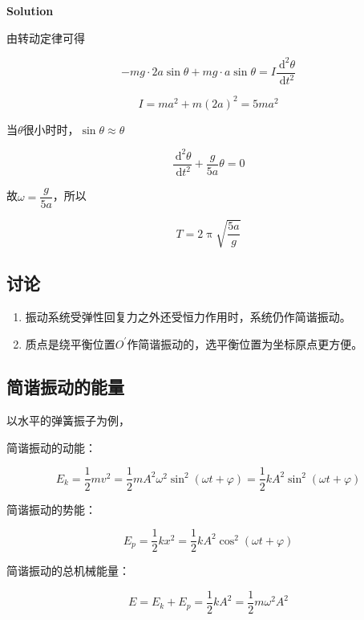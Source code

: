 \documentclass[12pt, a4paper]{article}
\numberwithin{equation}{section}
\newcommand{\rmd}{\mathrm{~d}}
\begin{document}
    \vspace{1em}

    \textbf{Solution}
    \vspace{1em}

    由转动定律可得

    \[
        -mg \cdot 2a \sin \theta + mg \cdot a \sin \theta = I \frac{\rmd^2 \theta}{\rmd t^2}
    \]

    \[
        I = ma^2 + m\left(2a\right)^2 = 5 ma^2
    \]

    当\(\theta\)很小时时，\(\sin \theta \approx \theta\)

    \[
        \frac{\rmd^2 \theta}{\rmd t^2} + \frac{g}{5a}\theta =0
    \]

    故\(\omega = \dfrac{g}{5a}\)，所以

    \[
        T = 2\uppi \sqrt{\frac{5a}{g}}
    \]

\subsection{讨论}

    \begin{enumerate}
        \item 振动系统受弹性回复力之外还受恒力作用时，系统仍作简谐振动。
        \item 质点是绕平衡位置\(O^{\prime}\)作简谐振动的，选平衡位置为坐标原点更方便。
    \end{enumerate}

\subsection{简谐振动的能量}

    以水平的弹簧振子为例，

    简谐振动的动能：

    \begin{equation}
        E_k=\frac{1}{2} m v^2 =\frac{1}{2} m A^2 \omega^2 \sin ^2(\omega t+\varphi)
        =\frac{1}{2} k A^2 \sin ^2(\omega t+\varphi)
    \end{equation}

    简谐振动的势能：

    \begin{equation}
        E_p=\frac{1}{2} k x^2=\frac{1}{2} k A^2 \cos ^2(\omega t+\varphi)
    \end{equation}

    简谐振动的总机械能量：

    \begin{equation}
        E=E_k+E_p=\frac{1}{2} k A^2=\frac{1}{2} m \omega^2 A^2
    \end{equation}
\end{document}
